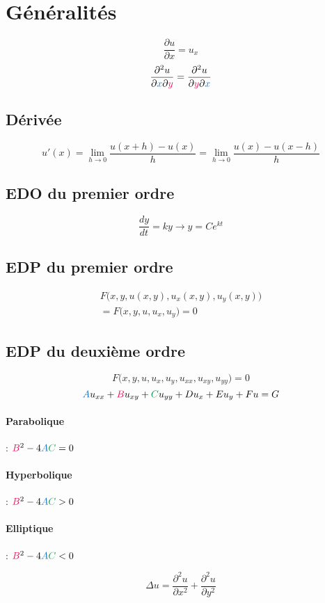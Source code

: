 \documentclass[resume]{subfiles}
\begin{document}
\section{Généralités}
$$\boxed{\frac{\partial u}{\partial x}=u_x}$$
$$\frac{\partial^2 u}{\partial \textcolor{RoyalBlue}{x}\partial \textcolor{OrangeRed}{y}}=\frac{\partial^2 u}{\partial \textcolor{OrangeRed}{y}\partial \textcolor{RoyalBlue}{x}}$$
\subsection{Dérivée}
$$u'(x)=\lim_{h\to 0}\frac{u(x+h)-u(x)}{h}=\lim_{h\to 0}\frac{u(x)-u(x-h)}{h}$$
\subsection{EDO du premier ordre}
$$\boxed{\frac{dy}{dt}=ky\longrightarrow y=Ce^{kt}}$$
\subsection{EDP du premier ordre}
\begin{multline*}
F\Big(x,y,u(x,y),u_x(x,y),u_y(x,y)\Big)\\=F\Big(x,y,u,u_x,u_y\Big)=0
\end{multline*}
\subsection{EDP du deuxième ordre}
$$F\Big(x,y,u,u_x,u_y,u_{xx},u_{xy},u_{yy}\Big)=0$$
$$\textcolor{RoyalBlue}{A}u_{xx}+\textcolor{OrangeRed}{B}u_{xy}+\textcolor{ForestGreen}{C}u_{yy}+Du_x+Eu_y+Fu=G$$
\paragraph{Parabolique} : $\textcolor{OrangeRed}{B}^2-4\textcolor{RoyalBlue}{A}\textcolor{ForestGreen}{C}=0$
\paragraph{Hyperbolique} : $\textcolor{OrangeRed}{B}^2-4\textcolor{RoyalBlue}{A}\textcolor{ForestGreen}{C}>0$
\paragraph{Elliptique} : $\textcolor{OrangeRed}{B}^2-4\textcolor{RoyalBlue}{A}\textcolor{ForestGreen}{C}<0$

$$\Delta u = \frac{\partial^2 u}{\partial x^2}+\frac{\partial^2 u}{\partial y^2}$$
\end{document}
